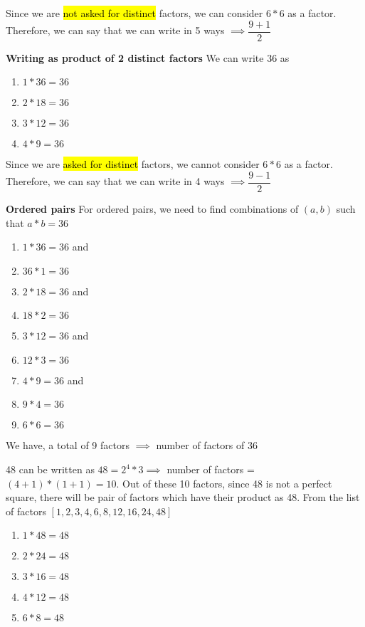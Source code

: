Since we are \hl{not asked for distinct} factors, we can consider $6*6$ as a factor. Therefore, we can say that we can write in 5 ways $\implies \dfrac{9 + 1}{2}$

\textbf{Writing as product of 2 distinct factors}
We can write 36 as 
\begin{enumerate}
    \item $1    *   36 = 36$
    \item $2    *   18 = 36$
    \item $3    *   12 = 36$
    \item $4    *   9 = 36$
\end{enumerate}

Since we are \hl{asked for distinct} factors, we cannot consider $6*6$ as a factor. Therefore, we can say that we can write in 4 ways $\implies \dfrac{9 - 1}{2}$

\textbf{Ordered pairs}
For ordered pairs, we need to find combinations of $(a,b)$ such that $a*b = 36$

\begin{enumerate}
    \item $1    *   36  = 36$   and     \item $36 *   1  = 36$
    \item $2    *   18  = 36$   and     \item $18 *   2  = 36$
    \item $3    *   12  = 36$   and     \item $12 *   3  = 36$
    \item $4    *   9   = 36$   and     \item $9  *   4   = 36$
    \item $6    *   6   = 36$
\end{enumerate}

We have, a total of 9 factors $\implies$ number of factors of 36


48 can be written as $48 = 2^4 * 3 \implies$ number of factors = $(4+1) * (1+1) = 10$. Out of these 10 factors, since 48 is not a perfect square, there will be pair of factors which have their product as 48. From the list of factors $[ 1,2,3,4,6,8,12,16,24,48 ]$
\begin{enumerate}
    \item $1 * 48 = 48$
    \item $2 * 24 = 48$
    \item $3 * 16 = 48$
    \item $4 * 12 = 48$
    \item $6 * 8 = 48$
\end{enumerate}

